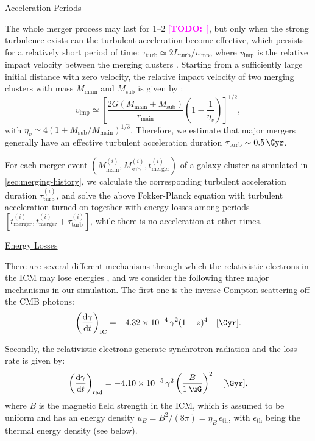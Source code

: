 \documentclass[modern]{aastex61}
\newcommand{\R}[1]{\mathrm{#1}}
\newcommand{\D}[1]{\R{d} #1}
\newcommand{\diff}[2]{\frac{\D{#1}}{\D{#2}}}
\newcommand{\TODO}[1]{\textcolor{magenta}{[\textbf{TODO:}~\uuline{#1}]}}
\begin{document}
\vspace{1ex}
\uline{Acceleration Periods}

The whole merger process may last for \SIrange{1}{2}{\Gyr} \TODO{ref???},
but only when the strong turbulence exists can the turbulent acceleration
become effective, which persists for a relatively short period of time:
$\tau_{\R{turb}} \simeq 2 L_{\R{turb}} / v_{\R{imp}}$,
where $v_{\R{imp}}$ is the relative impact velocity between the merging
clusters \citep{miniati2015}.
Starting from a sufficiently large initial distance with zero velocity,
the relative impact velocity of two merging clusters with mass
$M_{\R{main}}$ and $M_{\R{sub}}$ is given by \citep{sarazin2002,cassano2005}:
\begin{equation}
  \label{eq:v-imp}
  v_{\R{imp}} \simeq \left[
    \frac{2G (M_{\R{main}} + M_{\R{sub}})}{r_{\R{main}}}
    \left( 1 - \frac{1}{\eta_v} \right)\right]^{1/2},
\end{equation}
with $\eta_v \simeq 4 (1 + M_{\R{sub}}/M_{\R{main}})^{1/3}$.
Therefore, we estimate that major mergers generally have an effective
turbulent acceleration duration $\tau_{\R{turb}} \sim \SI{0.5}{\Gyr}$.

For each merger event
$(M^{(i)}_{\R{main}}, M^{(i)}_{\R{sub}}, t^{(i)}_{\R{merger}})$
of a galaxy cluster as simulated in \autoref{sec:merging-history},
we calculate the corresponding turbulent acceleration duration
$\tau^{(i)}_{\R{turb}}$, and solve the above Fokker-Planck equation with
turbulent acceleration turned on together with energy losses among
periods $[t^{(i)}_{\R{merger}}, t^{(i)}_{\R{merger}}+\tau^{(i)}_{\R{turb}}]$,
while there is no acceleration at other times.

\vspace{1ex}
\uline{Energy Losses}

There are several different mechanisms through which the relativistic
electrons in the ICM may lose energies \citep{sarazin1999},
and we consider the following three major mechanisms in our simulation.
The first one is the inverse Compton scattering off the CMB photons:
\begin{equation}
  \label{eq:eloss-ic}
  \left( \diff{\gamma}{t} \right)_{\R{IC}} =
    \num{-4.32e-4} \,\gamma^2 (1+z)^4
    \quad [\si{\per\Gyr}].
\end{equation}

Secondly, the relativistic electrons generate synchrotron radiation
and the loss rate is given by:
\begin{equation}
  \label{eq:eloss-syn}
  \left( \diff{\gamma}{t} \right)_{\R{rad}} =
    \num{-4.10e-5} \,\gamma^2 \left( \frac{B}{\SI{1}{\uG}} \right)^2
    \quad [\si{\per\Gyr}],
\end{equation}
where $B$ is the magnetic field strength in the ICM, which is assumed
to be uniform and has an energy density
$u_B = B^2 / (8\pi) = \eta_B \,\epsilon_{\R{th}}$,
with $\epsilon_{\R{th}}$ being the thermal energy density (see below).
\end{document}
